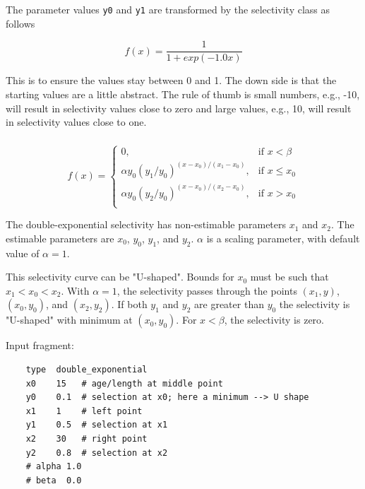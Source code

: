 The parameter values \texttt{y0} and \texttt{y1} are transformed by the selectivity class as follows

\[
f(x) = \frac{1}{1+exp(-1.0 x )}
\] 

This is to ensure the values stay between 0 and 1. The down side is that the starting values are a little abstract. The rule of thumb is small numbers, e.g., -10, will result in selectivity values close to zero and large values, e.g., 10, will result in selectivity values close to one.

\subsubsection[Double exponential]{}  \label{sec:Selectivity-DoubleExponential}

\begin{equation}
f(x)=\begin{cases}
	  0, & \text{if $x < \beta$} \\
	  \alpha y_0(y_1 / y_0)^{(x-x_0)/(x_1-x_0)}, & \text{if $x \le x_0$} \\
	  \alpha y_0(y_2 / y_0)^{(x-x_0)/(x_2-x_0)}, & \text{if $x > x_0$} \\
  \end{cases}
\end{equation}

The double-exponential selectivity has non-estimable parameters $x_1$ and $x_2$. The estimable parameters are $x_0$, $y_0$, $y_1$, and $y_2$.  $\alpha$ is a scaling parameter, with default value of $\alpha = 1$. 

This selectivity curve can be "U-shaped". Bounds for $x_0$ must be such that $x_1 < x_0 < x_2$. With $\alpha=1$, the selectivity passes through the points $(x_1, y)$, $(x_0, y_0)$, and $(x_2, y_2)$. If both $y_1$ and $y_2$ are greater than $y_0$ the selectivity is "U-shaped" with minimum at $(x_0, y_0)$.  For $x < \beta$, the selectivity is zero.

Input fragment: 
{\small{\begin{verbatim}
	type  double_exponential
	x0    15   # age/length at middle point
	y0    0.1  # selection at x0; here a minimum --> U shape
	x1    1    # left point
	y1    0.5  # selection at x1
	x2    30   # right point
	y2    0.8  # selection at x2
	# alpha 1.0
	# beta  0.0
\end{verbatim}}}

%
%

